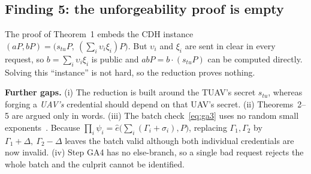 \subsection{Finding 5: the unforgeability proof is empty}
\begin{flawbox}[title={Theorem 1 reduces to a problem that is not hard}]
\begin{finding}\label{f:proof}
The proof of Theorem~1 embeds the CDH instance $(aP,bP)=\big(s_{tu}P,\ (\sum_i\upsilon_i\xi_i)P\big)$. But $\upsilon_i$ and $\xi_i$ are sent in clear in
every request, so $b=\sum_i\upsilon_i\xi_i$ is public and $abP=b\cdot(s_{tu}P)$ can be computed directly. Solving this ``instance'' is
not hard, so the reduction proves nothing.
\end{finding}
\textbf{Further gaps.} (i) The reduction is built around the TUAV's secret $s_{tu}$, whereas forging a \emph{UAV's} credential should depend on that
UAV's secret. (ii) Theorems~2--5 are argued only in words. (iii) The batch check~\eqref{eq:ga3} uses no random small exponents~\cite{bgr}. Because
$\prod_i\psi_i=\hat e\big(\sum_i(\Gamma_i+\sigma_i),P\big)$, replacing $\Gamma_1,\Gamma_2$ by $\Gamma_1+\Delta,\ \Gamma_2-\Delta$ leaves the batch valid
although both individual credentials are now invalid. (iv) Step GA4 has no else-branch, so a single bad request rejects the whole batch and the
culprit cannot be identified.
\end{flawbox}

